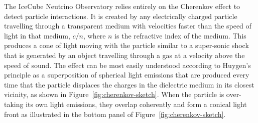 The IceCube Neutrino Observatory relies entirely on the Cherenkov effect to detect particle interactions.
It is created by any electrically charged particle travelling through a transparent medium with velocities faster than the speed of light in that medium, $c/n$, where $n$ is the refractive index of the medium.
This produces a cone of light moving with the particle similar to a super-sonic shock that is generated by an object travelling through a gas at a velocity above the speed of sound.
The effect can be most easily understood according to Huygen's principle as a superposition of spherical light emissions that are produced every time that the particle displaces the charges in the dielectric medium in its closest vicinity, as shown in Figure~\ref{fig:cherenkov-sketch}.
When the particle is over-taking its own light emissions, they overlap coherently and form a conical light front as illustrated in the bottom panel of Figure~\ref{fig:cherenkov-sketch}.
